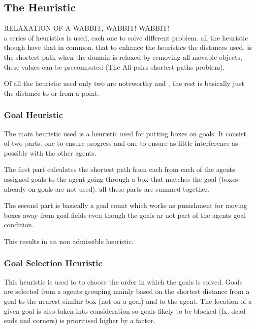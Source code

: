 \documentclass[letterpaper]{article}
\begin{document}
		\subsection{The Heuristic}
			RELAXATION OF A WABBIT, WABBIT! WABBIT!\\
			a series of heuristics is used, each one to solve different problem. all the heuristic though have that in common, that to enhance the heuristics the distances used, is the shortest path when the domain is relaxed by removing all movable objects, these values can be precomputed (The All-pairs shortest paths problem).
					
			Of all the heuristic used only two are noteworthy  and , the rest is basically just the distance to or from a point.
			\subsubsection{Goal Heuristic}\label{Goal1}
				The main heuristic used is a heuristic used for putting boxes on goals. It consist of two parts, one to ensure progress and one to ensure as little interference as possible with the other agents.
				
				The first part calculates the shortest path from each from each of the agents assigned goals to the agent going through a box that matches the goal (boxes already on goals are not used). all these parts are summed together.
				
				The second part is basically a goal count which works as punishment for moving boxes away from goal fields even though the goals ar not part of the agents goal condition.
				
				This results in an non admissible heuristic.
			
			\subsubsection{Goal Selection Heuristic}\label{goal2}
				This heuristic is used to to choose the order in which the goals is solved. Goals are selected from a agents grouping mainly based on the shortest distance from a goal to the nearest similar box (not on a goal) and to the agent. The location of a given goal is also taken into consideration so goals likely to be blocked (fx. dead ends and corners) is prioritised higher by a factor.
\end{document}
